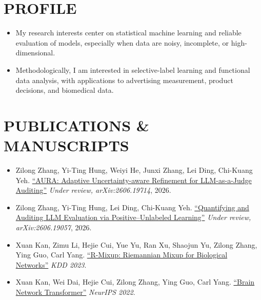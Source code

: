 \documentclass[letterpaper,11pt]{article}
\newcommand{\resumeItem}[1]{
  \item\small{
    {#1 \vspace{-2pt}}
  }
}
\newcommand{\resumeItemListStart}{\begin{itemize}}
\newcommand{\resumeItemListEnd}{\end{itemize}\vspace{-3pt}}
\begin{document}
\section{PROFILE}
\resumeItemListStart
  \resumeItem{My research interests center on statistical machine learning and reliable evaluation of models, especially when data are noisy, incomplete, or high-dimensional.}
  \resumeItem{Methodologically, I am interested in selective-label learning and functional data analysis, with applications to advertising measurement, product decisions, and biomedical data.}
\resumeItemListEnd
\vspace{-10pt}

\section{PUBLICATIONS \& MANUSCRIPTS}
\resumeItemListStart
    \resumeItem{
        Zilong Zhang, Yi-Ting Hung, Weiyi He, Junxi Zhang, Lei Ding, Chi-Kuang Yeh.
        \href{https://arxiv.org/abs/2606.19714}
        {``AURA: Adaptive Uncertainty-aware Refinement for LLM-as-a-Judge Auditing''}
        \textit{Under review, arXiv:2606.19714}, 2026.
    }

    \resumeItem{
        Zilong Zhang, Yi-Ting Hung, Lei Ding, Chi-Kuang Yeh.
    \href{https://arxiv.org/abs/2606.19057}
        {``Quantifying and Auditing LLM Evaluation via Positive--Unlabeled Learning''}
        \textit{Under review, arXiv:2606.19057}, 2026.
    }
    \resumeItem{Xuan Kan, Zimu Li, Hejie Cui, Yue Yu, Ran Xu, Shaojun Yu, Zilong Zhang, Ying Guo, Carl Yang.
        \href{https://dl.acm.org/doi/10.1145/3580305.3599483}{``R-Mixup: Riemannian Mixup for Biological Networks''}
        \textit{KDD 2023}.}
    \resumeItem{Xuan Kan, Wei Dai, Hejie Cui, Zilong Zhang, Ying Guo, Carl Yang.
        \href{https://proceedings.neurips.cc/paper_files/paper/2022/file/a408234a9b80604a9cf6ca518e474550-Paper-Conference.pdf}{``Brain Network Transformer''}
        \textit{NeurIPS 2022}.}
\resumeItemListEnd
\vspace{-10pt}

\end{document}
